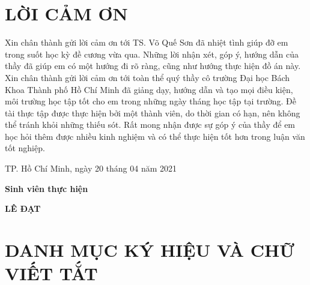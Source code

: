 \documentclass[13pt,a4paper]{article}
\begin{document}
\cleardoublepage
{}
\tableofcontents
\thispagestyle{empty}
\cleardoublepage

\section*{LỜI CẢM ƠN}
\thispagestyle{empty}
Xin chân thành gửi lời cảm ơn tới TS. Võ Quế Sơn đã nhiệt tình giúp đỡ em trong suốt học kỳ đề cương vừa qua. Những lời nhận xét, góp ý, hướng dẫn của thầy đã giúp em có một hướng đi rõ ràng, cũng như hướng thực hiện đồ án này. Xin chân thành gửi lời cảm ơn tới toàn thể quý thầy cô trường Đại học Bách Khoa Thành phố Hồ Chí Minh đã giảng dạy, hướng dẫn và tạo mọi điều kiện, môi trường học tập tốt cho em trong những ngày tháng học tập tại trường. Đề tài thực tập được thực hiện bởi một thành viên, do thời gian có hạn, nên không thể tránh khỏi những thiếu sót. Rất mong nhận được sự góp ý của thầy để em học  hỏi thêm được nhiều kinh nghiệm và có thể thực hiện tốt hơn trong luận văn tốt nghiệp.

\vspace{6pt}
\hspace{7cm} TP. Hồ Chí Minh, ngày 20 tháng 04 năm 2021

\hspace{9cm}\textbf{Sinh viên thực hiện}

\vspace{2cm}
\hspace{9.85cm}\textbf{LÊ ĐẠT}
\cleardoublepage


\section*{DANH MỤC KÝ HIỆU VÀ CHỮ VIẾT TẮT}
\cleardoublepage

\listoffigures
{}
\cleardoublepage

\listoftables
{}
\cleardoublepage













\end{document}
